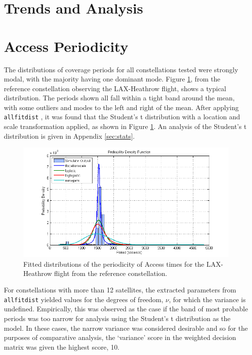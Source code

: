 \section{Trends and Analysis}





\section{Access Periodicity} \label{sec:periodicity_stats}
The distributions of coverage periods for all constellations tested were strongly modal, with the majority having one dominant mode. Figure \ref{fig:allfitdist_Heathrow}, from the reference constellation observing the LAX-Heathrow flight, shows a typical distribution. The periods shown all fall within a tight band around the mean, with some outliers and modes to the left and right of the mean. After applying \verb|allfitdist| \cite{sheppard12}, it was found that the Student's t distribution with a location and scale transformation applied, as shown in Figure \ref{fig:allfitdist_Heathrow}. An analysis of the Student's t distribution is given in Appendix \ref{sec:stats}.

\begin{figure}[htbp]
	\centering
	\includegraphics[scale = 0.85]{Pictures/allfitdist_Heathrow.png}
	
	\caption{Fitted distributions of the periodicity of Access times for the LAX-Heathrow flight from the reference constellation. }
	\label{fig:allfitdist_Heathrow}
\end{figure} 
For constellations with more than 12 satellites, the extracted parameters from \verb|allfitdist| yielded values for the degrees of freedom, $\nu$, for which the variance is undefined. Empirically, this was observed as the case if the band of most probable periods was too narrow for analysis using the Student's t distribution as the model. In these cases, the narrow variance was considered desirable and so for the purposes of comparative analysis, the `variance' score in the weighted decision matrix was given the highest score, 10.

